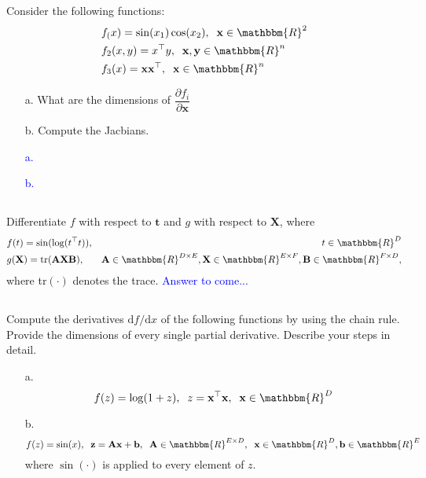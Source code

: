 \documentclass[a4paper,12pt]{article}
\newcommand{\R}{\mathbbm{R}}
\newcommand{\vecx}{\textbf{x}}
\newcommand{\vecy}{\textbf{y}}
\newcommand{\vecz}{\textbf{z}}
\newcommand{\vecb}{\textbf{b}}
\newcommand{\matA}{\textbf{A}}
\newcommand{\matB}{\textbf{B}}
\begin{document}
\subsection{}
Consider the following functions:
\begin{align*}
& f_(x) = \sin(x_1)\cos(x_2), \;\; \vecx \in \R^2 \\
& f_2(x,y) = x^\top y, \;\; \vecx, \vecy \in \R^n \\
& f_3(x) = \vecx \vecx^\top, \;\; \vecx \in \R^n
\end{align*}
\begin{itemize}
 \item [a.] What are the dimensions of $\dfrac{\partial f_i}{\partial \vecx}$
 \item [b.] Compute the Jacbians.
\end{itemize}
\textcolor{blue}{
\begin{itemize}
 \item [a.] 
 \item [b.] 
\end{itemize}
}
\subsection{}
Differentiate $f$ with respect to $\textbf{t}$ and $g$ with respect to $\textbf{X}$, where 
\begin{align*}
& f(t)=\sin(\log(t^\top t)), & t \in \R^D \\
& g(\textbf{X}) = \textrm{tr}(\matA \textbf{X} \matB), & \matA \in \R^{D \times E}, \textbf{X} \in \R^{E \times F}, \matB \in \R^{F \times D},
\end{align*}
where tr$(\cdot)$ denotes the trace.
\textcolor{blue}{
Answer to come...
}
\subsection{}
Compute the derivatives $\textrm{d}f/\textrm{d}x$ of the following functions by using the chain rule. Provide the dimensions of every single partial derivative. Describe your steps in detail.
\begin{itemize}
 \item [a.] $$f(z) = \log(1+z), \;\; z = \vecx^\top \vecx, \;\; \vecx \in \R^D$$
 \item [b.] $$f(z) = \sin(x), \;\; \vecz = \matA \vecx + \vecb, \;\; \matA \in \R^{E \times D}, \;\; \vecx \in \R^D, \vecb \in \R^E$$
 where $\sin(\cdot)$ is applied to every element of $z$.
\end{itemize}
\end{document}
